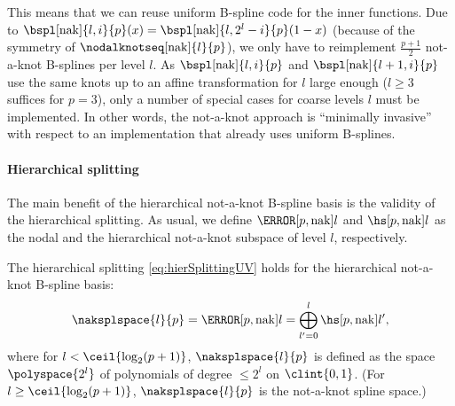 \vspace*{\fill}

\noindent
This means that we can reuse uniform B-spline code
for the inner functions.
Due to $\bspl[\nak]{l,i}{p}(x) = \bspl[\nak]{l,2^l-i}{p}(1-x)$
(because of the symmetry of $\nodalknotseq[\nak]{l}{p}$),
we only have to reimplement $\tfrac{p+1}{2}$ not-a-knot B-splines per level $l$.
As $\bspl[\nak]{l,i}{p}$ and $\bspl[\nak]{l+1,i}{p}$
use the same knots up to an affine transformation for $l$ large enough
($l \ge 3$ suffices for $p = 3$),
only a number of special cases for coarse levels $l$ must be implemented.
In other words, the not-a-knot approach is ``minimally invasive''
with respect to an implementation that already uses uniform B-splines.

\pagebreak

\paragraph{Hierarchical splitting}

The main benefit of the hierarchical not-a-knot B-spline basis
is the validity of the hierarchical splitting.
As usual, we define $\nsbspl[\nak]{l}{p}$ and $\hsbspl[\nak]{l}{p}$
as the nodal and the hierarchical not-a-knot subspace of level $l$,
respectively.

\begin{proposition}
  \label{prop:hierSplittingNAKBSplineUV}
  The hierarchical splitting \eqref{eq:hierSplittingUV}
  holds for the hierarchical not-a-knot B-spline basis:
  \begin{equation}
    \naksplspace{l}{p}
    = \nsbspl[\nak]{l}{p}
    = \bigoplus_{l'=0}^l \hsbspl[\nak]{l'}{p},
  \end{equation}
  where for $l < \ceil{\log_2(p+1)}$, $\naksplspace{l}{p}$
  is defined as the space $\polyspace{2^l}$ of polynomials of degree
  $\le 2^l$ on $\clint{0, 1}$.
  (For $l \ge \ceil{\log_2(p+1)}$,
  $\naksplspace{l}{p}$ is the not-a-knot spline space.)
\end{proposition}

